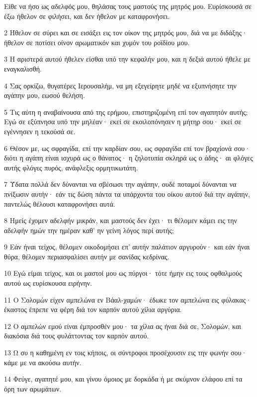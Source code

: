 \par Είθε να ήσο ως αδελφός μου, θηλάσας τους μαστούς της μητρός μου. Ευρίσκουσά σε έξω ήθελον σε φιλήσει, και δεν ήθελον με καταφρονήσει.
\par 2 Ήθελον σε σύρει και σε εισάξει εις τον οίκον της μητρός μου, διά να με διδάξης· ήθελον σε ποτίσει οίνον αρωματικόν και χυμόν του ροϊδίου μου.
\par 3 Η αριστερά αυτού ήθελεν είσθαι υπό την κεφαλήν μου, και η δεξιά αυτού ήθελε με εναγκαλισθή.
\par 4 Σας ορκίζω, θυγατέρες Ιερουσαλήμ, να μη εξεγείρητε μηδέ να εξυπνήσητε την αγάπην μου, εωσού θελήση.
\par 5 Τις αύτη η αναβαίνουσα από της ερήμου, επιστηριζομένη επί τον αγαπητόν αυτής; Εγώ σε εξύπνησα υπό την μηλέαν· εκεί σε εκοιλοπόνησεν η μήτηρ σου· εκεί σε εγέννησεν η τεκούσά σε.
\par 6 Θέσον με, ως σφραγίδα, επί την καρδίαν σου, ως σφραγίδα επί τον βραχίονά σου· διότι η αγάπη είναι ισχυρά ως ο θάνατος· η ζηλοτυπία σκληρά ως ο άδης· αι φλόγες αυτής φλόγες πυρός, ανάφλεξις ορμητικωτάτη.
\par 7 Ύδατα πολλά δεν δύνανται να σβέσωσι την αγάπην, ουδέ ποταμοί δύνανται να πνίξωσιν αυτήν· εάν τις δώση πάντα τα υπάρχοντα του οίκου αυτού διά την αγάπην, παντελώς θέλουσι καταφρονήσει αυτά.
\par 8 Ημείς έχομεν αδελφήν μικράν, και μαστούς δεν έχει· τι θέλομεν κάμει εις την αδελφήν ημών την ημέραν καθ' ην γείνη λόγος περί αυτής;
\par 9 Εάν ήναι τείχος, θέλομεν οικοδομήσει επ' αυτήν παλάτιον αργυρούν· και εάν ήναι θύρα, θέλομεν περιασφαλίσει αυτήν με σανίδας κεδρίνας.
\par 10 Εγώ είμαι τείχος, και οι μαστοί μου ως πύργοι· τότε ήμην εις τους οφθαλμούς αυτού ως ευρίσκουσα ειρήνην.
\par 11 Ο Σολομών είχεν αμπελώνα εν Βάαλ-χαμών· έδωκε τον αμπελώνα εις φύλακας· έκαστος έπρεπε να φέρη διά τον καρπόν αυτού χίλια αργύρια.
\par 12 Ο αμπελών εμού είναι έμπροσθέν μου· τα χίλια ας ήναι διά σε, Σολομών, και διακόσια διά τους φυλάττοντας τον καρπόν αυτού.
\par 13 Ω συ η καθημένη εν τοις κήποις, οι σύντροφοι προσέχουσιν εις την φωνήν σου· κάμε με να ακούσω αυτήν.
\par 14 Φεύγε, αγαπητέ μου, και γίνου όμοιος με δορκάδα ή με σκύμνον ελάφου επί τα όρη των αρωμάτων.


